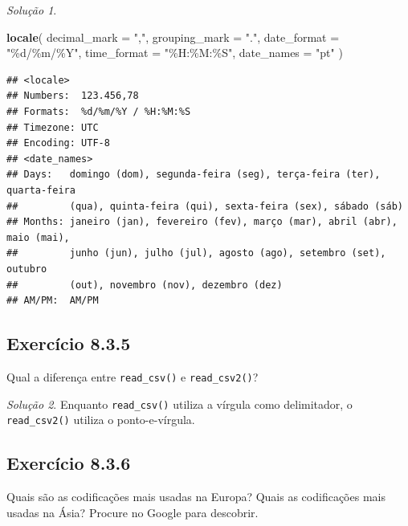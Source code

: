\documentclass[
]{latex/krantz}
\newenvironment{Shaded}{\begin{snugshade}}{\end{snugshade}}
\newcommand{\AttributeTok}[1]{\textcolor[rgb]{0.13,0.29,0.53}{#1}}
\newcommand{\FunctionTok}[1]{\textcolor[rgb]{0.13,0.29,0.53}{\textbf{#1}}}
\newcommand{\NormalTok}[1]{#1}
\newcommand{\StringTok}[1]{\textcolor[rgb]{0.31,0.60,0.02}{#1}}
\theoremstyle{definition}
\theoremstyle{definition}
\theoremstyle{definition}
\theoremstyle{definition}
\theoremstyle{remark}
\newtheorem*{solution}{Solução}
\begin{document}
\begin{solution}
\leavevmode

\begin{Shaded}
\begin{Highlighting}[]
\FunctionTok{locale}\NormalTok{(}
    \AttributeTok{decimal\_mark =} \StringTok{","}\NormalTok{,}
    \AttributeTok{grouping\_mark =} \StringTok{"."}\NormalTok{,}
    \AttributeTok{date\_format =} \StringTok{"\%d/\%m/\%Y"}\NormalTok{,}
    \AttributeTok{time\_format =} \StringTok{"\%H:\%M:\%S"}\NormalTok{,}
    \AttributeTok{date\_names =} \StringTok{"pt"}
\NormalTok{)}
\end{Highlighting}
\end{Shaded}

\begin{verbatim}
## <locale>
## Numbers:  123.456,78
## Formats:  %d/%m/%Y / %H:%M:%S
## Timezone: UTC
## Encoding: UTF-8
## <date_names>
## Days:   domingo (dom), segunda-feira (seg), terça-feira (ter), quarta-feira
##         (qua), quinta-feira (qui), sexta-feira (sex), sábado (sáb)
## Months: janeiro (jan), fevereiro (fev), março (mar), abril (abr), maio (mai),
##         junho (jun), julho (jul), agosto (ago), setembro (set), outubro
##         (out), novembro (nov), dezembro (dez)
## AM/PM:  AM/PM
\end{verbatim}

\end{solution}

\hypertarget{exr8-3-5}{%
\subsection*{Exercício 8.3.5}\label{exr8-3-5}}

Qual a diferença entre \texttt{read\_csv()} e \texttt{read\_csv2()}?

\begin{solution}
Enquanto \texttt{read\_csv()} utiliza a vírgula como delimitador, o \texttt{read\_csv2()} utiliza o ponto-e-vírgula.
\end{solution}

\hypertarget{exr8-3-6}{%
\subsection*{Exercício 8.3.6}\label{exr8-3-6}}

Quais são as codificações mais usadas na Europa? Quais as codificações mais usadas na Ásia? Procure no Google para descobrir.
\end{document}
